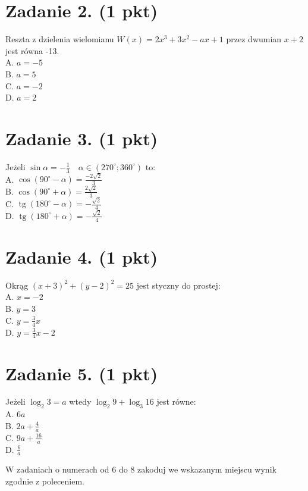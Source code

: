 \documentclass[10pt]{article}
\begin{document}
\section*{Zadanie 2. (1 pkt)}
Reszta z dzielenia wielomianu \(W(x)=2 x^{3}+3 x^{2}-a x+1\) przez dwumian \(x+2\) jest równa -13.\\
A. \(a=-5\)\\
B. \(a=5\)\\
C. \(a=-2\)\\
D. \(a=2\)

\section*{Zadanie 3. (1 pkt)}
Jeżeli \(\sin \alpha=-\frac{1}{3} \quad \alpha \in\left(270^{\circ} ; 360^{\circ}\right)\) to:\\
A. \(\cos \left(90^{\circ}-\alpha\right)=\frac{-2 \sqrt{2}}{3}\)\\
B. \(\cos \left(90^{\circ}+\alpha\right)=\frac{2 \sqrt{2}}{3}\)\\
C. \(\operatorname{tg}\left(180^{\circ}-\alpha\right)=-\frac{\sqrt{2}}{4}\)\\
D. \(\operatorname{tg}\left(180^{\circ}+\alpha\right)=-\frac{\sqrt{2}}{4}\)

\section*{Zadanie 4. (1 pkt)}
Okrąg \((x+3)^{2}+(y-2)^{2}=25\) jest styczny do prostej:\\
A. \(x=-2\)\\
B. \(y=3\)\\
C. \(y=\frac{3}{4} x\)\\
D. \(y=\frac{3}{4} x-2\)

\section*{Zadanie 5. (1 pkt)}
Jeżeli \(\log _{2} 3=a\) wtedy \(\log _{2} 9+\log _{3} 16\) jest równe:\\
A. \(6 a\)\\
B. \(2 a+\frac{4}{a}\)\\
C. \(9 a+\frac{16}{a}\)\\
D. \(\frac{6}{a}\)

W zadaniach o numerach od 6 do 8 zakoduj we wskazanym miejscu wynik zgodnie z poleceniem.
\end{document}
